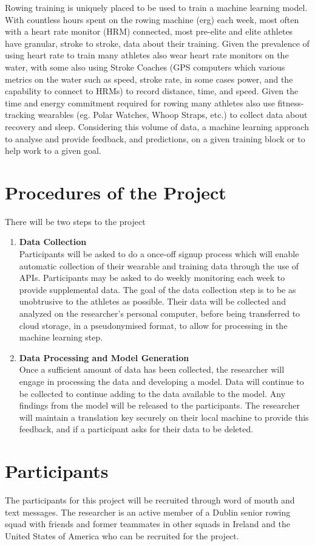 Rowing training is uniquely placed to be used to train a machine learning model. With countless hours spent on the rowing machine (erg) each week, most often with a heart rate monitor (HRM) connected, most pre-elite and elite athletes have granular, stroke to stroke, data about their training. Given the prevalence of using heart rate to train many athletes also wear heart rate monitors on the water, with some also using Stroke Coaches (GPS computers which various metrics on the water such as speed, stroke rate, in some cases power, and the capability to connect to HRMs) to record distance, time, and speed. Given the time and energy commitment required for rowing many athletes also use fitness-tracking wearables (eg. Polar Watches, Whoop Straps, etc.) to collect data about recovery and sleep. Considering this volume of data, a machine learning approach to analyse and provide feedback, and predictions, on a given training block or to help work to a given goal.
\section*{Procedures of the Project}
There will be two steps to the project
\begin{enumerate}
    \item \textbf{Data Collection}\\Participants will be asked to do a once-off signup process which will enable automatic collection of their wearable and training data through the use of APIs. Participants may be asked to do weekly monitoring each week to provide supplemental data. The goal of the data collection step is to be as unobtrusive to the athletes as possible. Their data will be collected and analyzed on the researcher's personal computer, before being transferred to cloud storage, in a pseudonymised format, to allow for processing in the machine learning step.
    \item \textbf{Data Processing and Model Generation}\\Once a sufficient amount of data has been collected, the researcher will engage in processing the data and developing a model. Data will continue to be collected to continue adding to the data available to the model. Any findings from the model will be released to the participants. The researcher will maintain a translation key securely on their local machine to provide this feedback, and if a participant asks for their data to be deleted.
\end{enumerate}
\section*{Participants}
The participants for this project will be recruited through word of mouth and text messages. The researcher is an active member of a Dublin senior rowing squad with friends and former teammates in other squads in Ireland and the United States of America who can be recruited for the project.  

